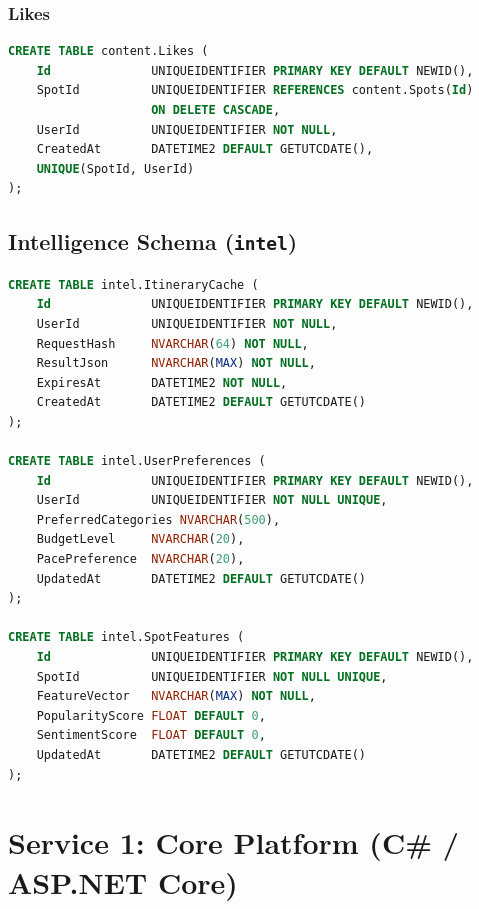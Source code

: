 \documentclass[12pt,letterpaper]{article}
\begin{document}
\subsubsection{Likes}
\begin{lstlisting}[style=code,language=SQL]
CREATE TABLE content.Likes (
    Id              UNIQUEIDENTIFIER PRIMARY KEY DEFAULT NEWID(),
    SpotId          UNIQUEIDENTIFIER REFERENCES content.Spots(Id)
                    ON DELETE CASCADE,
    UserId          UNIQUEIDENTIFIER NOT NULL,
    CreatedAt       DATETIME2 DEFAULT GETUTCDATE(),
    UNIQUE(SpotId, UserId)
);
\end{lstlisting}

\subsection{Intelligence Schema (\texttt{intel})}
\begin{lstlisting}[style=code,language=SQL]
CREATE TABLE intel.ItineraryCache (
    Id              UNIQUEIDENTIFIER PRIMARY KEY DEFAULT NEWID(),
    UserId          UNIQUEIDENTIFIER NOT NULL,
    RequestHash     NVARCHAR(64) NOT NULL,
    ResultJson      NVARCHAR(MAX) NOT NULL,
    ExpiresAt       DATETIME2 NOT NULL,
    CreatedAt       DATETIME2 DEFAULT GETUTCDATE()
);

CREATE TABLE intel.UserPreferences (
    Id              UNIQUEIDENTIFIER PRIMARY KEY DEFAULT NEWID(),
    UserId          UNIQUEIDENTIFIER NOT NULL UNIQUE,
    PreferredCategories NVARCHAR(500),
    BudgetLevel     NVARCHAR(20),
    PacePreference  NVARCHAR(20),
    UpdatedAt       DATETIME2 DEFAULT GETUTCDATE()
);

CREATE TABLE intel.SpotFeatures (
    Id              UNIQUEIDENTIFIER PRIMARY KEY DEFAULT NEWID(),
    SpotId          UNIQUEIDENTIFIER NOT NULL UNIQUE,
    FeatureVector   NVARCHAR(MAX) NOT NULL,
    PopularityScore FLOAT DEFAULT 0,
    SentimentScore  FLOAT DEFAULT 0,
    UpdatedAt       DATETIME2 DEFAULT GETUTCDATE()
);
\end{lstlisting}

\newpage

\section{Service 1: Core Platform (C\# / ASP.NET Core)}
\end{document}
